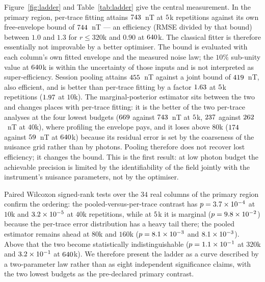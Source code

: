 \documentclass[aps,pra,twocolumn,superscriptaddress,nofootinbib]{revtex4-2}
\begin{document}
Figure~\ref{fig:ladder} and Table~\ref{tab:ladder} give the central measurement. In the
primary region, per-trace fitting attains $743$~nT at $5$k repetitions against
its own free-envelope bound of $744$~nT --- an efficiency (RMSE divided by that
bound) between $1.0$ and $1.3$ for $r\le320$k and $0.90$ at $640$k. The classical fitter
is therefore essentially not improvable by a better optimiser. The bound is evaluated with
each column's own fitted envelope and the measured noise law; the $10\%$ sub-unity value at
$640$k is within the uncertainty of those inputs and is not interpreted as
super-efficiency. Session pooling attains $455$~nT against a joint bound of
$419$~nT, also efficient, and is better than per-trace fitting by a factor
$1.63$ at $5$k repetitions ($1.97$ at $10$k). The
marginal-posterior estimator sits between the two and changes places with per-trace fitting:
it is the better of the two per-trace analyses at the four lowest budgets
($669$ against $743$~nT at $5$k, $237$ against
$262$~nT at $40$k), where profiling the envelope pays, and it loses above
$80$k ($174$ against $59$~nT at $640$k) because its residual
error is set by the coarseness of the nuisance grid rather than by photons. Pooling therefore does not recover lost
efficiency; it changes the bound. This is the first result: at low photon budget the
achievable precision is limited by the identifiability of the field jointly with the
instrument's nuisance parameters, not by the optimiser.

Paired Wilcoxon signed-rank tests over the $34$ real columns of the primary region confirm
the ordering: the pooled-versus-per-trace contrast has
$p=3.7\times10^{-4}$ at $10$k and $3.2\times10^{-5}$ at $40$k repetitions, while at
$5$k it is marginal ($p=9.8\times10^{-2}$) because the per-trace error distribution has
a heavy tail there; the pooled estimator remains ahead at $80$k and $160$k
($p=8.1\times10^{-3}$ and $8.1\times10^{-3}$). Above that the two become
statistically indistinguishable ($p=1.1\times10^{-1}$ at $320$k and
$3.2\times10^{-1}$ at $640$k). We therefore present the ladder as a curve described by a two-parameter
law rather than as eight independent significance claims, with the two lowest budgets as the
pre-declared primary contrast.
\end{document}
